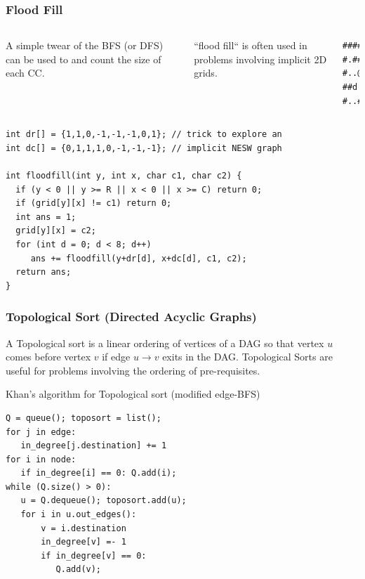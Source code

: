 \documentclass{beamer}
\begin{document}
\begin{frame}[fragile]
  \frametitle{Flood Fill}
  {\smaller
    \begin{columns}[T]
      A simple twear of the BFS (or DFS) can be used to
       and count the size of each CC.
      
      \medskip
      
      ``flood fill`` is often used in problems involving implicit 2D
      grids.
\begin{verbatim}
####..#
#.###.#
#..@.##
##d.###
#..####
\end{verbatim}
    \end{columns}

  \begin{exampleblock}{}
\begin{verbatim}
int dr[] = {1,1,0,-1,-1,-1,0,1}; // trick to explore an
int dc[] = {0,1,1,1,0,-1,-1,-1}; // implicit NESW graph

int floodfill(int y, int x, char c1, char c2) {
  if (y < 0 || y >= R || x < 0 || x >= C) return 0;
  if (grid[y][x] != c1) return 0;
  int ans = 1;
  grid[y][x] = c2;
  for (int d = 0; d < 8; d++)
     ans += floodfill(y+dr[d], x+dc[d], c1, c2);
  return ans;
}
\end{verbatim}
  \end{exampleblock}
  }
\end{frame}

\begin{frame}[fragile]
  \frametitle{Topological Sort (Directed Acyclic Graphs)} 

  {\smaller 
    A Topological sort is a linear ordering of vertices of a DAG so
    that vertex $u$ comes before vertex $v$ if edge $u \rightarrow v$
    exits in the DAG.  Topological Sorts are useful for problems
    involving the ordering of pre-requisites.

    \begin{exampleblock}{Khan's algorithm for Topological sort (modified edge-BFS)}
\begin{verbatim}
Q = queue(); toposort = list();
for j in edge:
   in_degree[j.destination] += 1
for i in node:
   if in_degree[i] == 0: Q.add(i);
while (Q.size() > 0):
   u = Q.dequeue(); toposort.add(u);
   for i in u.out_edges():
       v = i.destination
       in_degree[v] =- 1
       if in_degree[v] == 0:
          Q.add(v);
\end{verbatim}
    \end{exampleblock}

  }
\end{frame}
\end{document}
